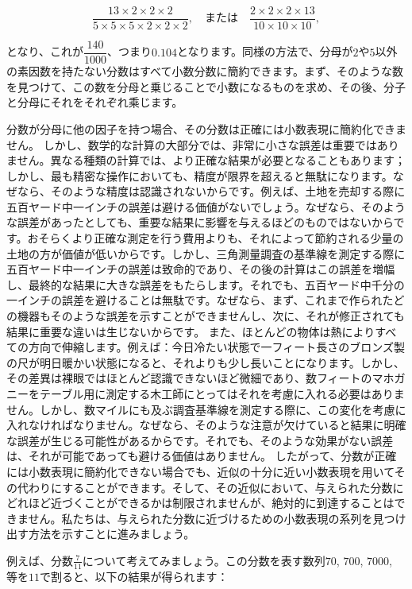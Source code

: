 \documentclass[a4paper,11pt,openany]{ltjsbook}
\begin{document}
\[
\frac{13 \times 2 \times 2 \times 2}{5 \times 5 \times 5 \times 2 \times 2 \times 2},\quad\text{または}\quad
\frac{2 \times 2 \times 2 \times 13}{10 \times 10 \times 10},
\]

となり、これが$\dfrac{140}{1000}$、つまり$0.104$となります。同様の方法で、分母が$2$や$5$以外の素因数を持たない分数はすべて小数分数に簡約できます。まず、そのような数を見つけて、この数を分母と乗じることで小数になるものを求め、その後、分子と分母にそれをそれぞれ乘じます。

分数が分母に他の因子を持つ場合、その分数は正確には小数表現に簡約化できません。
しかし、数学的な計算の大部分では、非常に小さな誤差は重要ではありません。異なる種類の計算では、より正確な結果が必要となることもあります；しかし、最も精密な操作においても、精度が限界を超えると無駄になります。なぜなら、そのような精度は認識されないからです。例えば、土地を売却する際に五百ヤード中一インチの誤差は避ける価値がないでしょう。なぜなら、そのような誤差があったとしても、重要な結果に影響を与えるほどのものではないからです。おそらくより正確な測定を行う費用よりも、それによって節約される少量の土地の方が価値が低いからです。しかし、三角測量調査の基準線を測定する際に五百ヤード中一インチの誤差は致命的であり、その後の計算はこの誤差を増幅し、最終的な結果に大きな誤差をもたらします。それでも、五百ヤード中千分の一インチの誤差を避けることは無駄です。なぜなら、まず、これまで作られたどの機器もそのような誤差を示すことができませんし、次に、それが修正されても結果に重要な違いは生じないからです。
また、ほとんどの物体は熱によりすべての方向で伸縮します。例えば：今日冷たい状態で一フィート長さのブロンズ製の尺が明日暖かい状態になると、それよりも少し長いことになります。しかし、その差異は裸眼ではほとんど認識できないほど微細であり、数フィートのマホガニーをテーブル用に測定する木工師にとってはそれを考慮に入れる必要はありません。しかし、数マイルにも及ぶ調査基準線を測定する際に、この変化を考慮に入れなければなりません。なぜなら、そのような注意が欠けていると結果に明確な誤差が生じる可能性があるからです。それでも、そのような効果がない誤差は、それが可能であっても避ける価値はありません。
したがって、分数が正確には小数表現に簡約化できない場合でも、近似の十分に近い小数表現を用いてその代わりにすることができます。そして、その近似において、与えられた分数にどれほど近づくことができるかは制限されませんが、絶対的に到達することはできません。私たちは、与えられた分数に近づけるための小数表現の系列を見つけ出す方法を示すことに進みましょう。

例えば、分数$\frac{7}{11}$について考えてみましょう。この分数を表す数列$70$, $700$, $7000$, 等を$11$で割ると、以下の結果が得られます：
\end{document}
